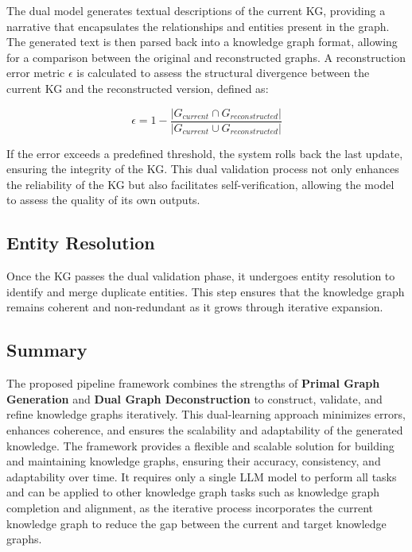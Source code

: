 \documentclass[11pt]{article}
\begin{document}
The dual model generates textual descriptions of the current KG, providing a narrative that encapsulates the relationships and entities present in the graph. The generated text is then parsed back into a knowledge graph format, allowing for a comparison between the original and reconstructed graphs. A reconstruction error metric $\epsilon$ is calculated to assess the structural divergence between the current KG and the reconstructed version, defined as:

\begin{equation}
    \epsilon = 1 - \frac{|G_{current} \cap G_{reconstructed}|}{|G_{current} \cup G_{reconstructed}|}
\end{equation}

If the error exceeds a predefined threshold, the system rolls back the last update, ensuring the integrity of the KG. This dual validation process not only enhances the reliability of the KG but also facilitates self-verification, allowing the model to assess the quality of its own outputs.

\subsection{Entity Resolution}

Once the KG passes the dual validation phase, it undergoes entity resolution to identify and merge duplicate entities. This step ensures that the knowledge graph remains coherent and non-redundant as it grows through iterative expansion.

\subsection{Summary}

The proposed pipeline framework combines the strengths of \textbf{Primal Graph Generation} and \textbf{Dual Graph Deconstruction} to construct, validate, and refine knowledge graphs iteratively. This dual-learning approach minimizes errors, enhances coherence, and ensures the scalability and adaptability of the generated knowledge. The framework provides a flexible and scalable solution for building and maintaining knowledge graphs, ensuring their accuracy, consistency, and adaptability over time. It requires only a single LLM model to perform all tasks and can be applied to other knowledge graph tasks such as knowledge graph completion and alignment, as the iterative process incorporates the current knowledge graph to reduce the gap between the current and target knowledge graphs.
\end{document}
